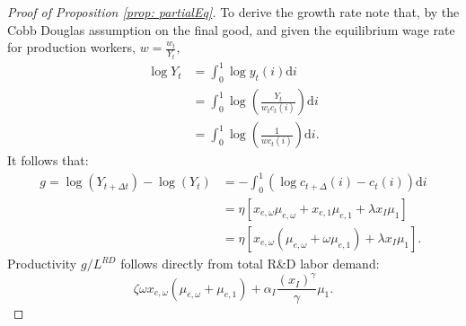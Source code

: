 \begin{proof}[Proof of Proposition \ref{prop: partialEq}]
To derive the growth rate note that, by the Cobb Douglas assumption
on the final good, and given the equilibrium wage rate for production
workers, $w=\frac{w_{t}}{Y_{t}},$
\begin{align*}
\log Y_{t} & =\int_{0}^{1}\log y_{t}(i)\mathrm{d}i\\
 & =\int_{0}^{1}\log\left(\frac{Y_{t}}{w_{t}c_{t}(i)}\right)\mathrm{d}i\\
 & =\int_{0}^{1}\log\left(\frac{1}{wc_{t}(i)}\right)\mathrm{d}i.
\end{align*}
It follows that:
\begin{align*}
g=\log\left(Y_{t+\Delta t}\right)-\log\left(Y_{t}\right) & =-\int_{0}^{1}\left(\log c_{t+\Delta}(i)-c_{t}(i)\right)\mathrm{d}i\\
 & =\eta\left[x_{e,\omega}\mu_{e,\omega}+x_{e,1}\mu_{e,1}+\lambda x_{I}\mu_{1}\right]\\
 & =\eta\left[x_{e,\omega}\left(\mu_{e,\omega}+\omega\mu_{e,1}\right)+\lambda x_{I}\mu_{1}\right].
\end{align*}
Productivity $g/L^{RD}$ follows directly from total R\&D labor demand:
\[
\zeta\omega x_{e,\omega}\left(\mu_{e,\omega}+\mu_{e,1}\right)+\alpha_{I}\frac{\left(x_{I}\right)^{\gamma}}{\gamma}\mu_{1}.
\]
\end{proof}
%
